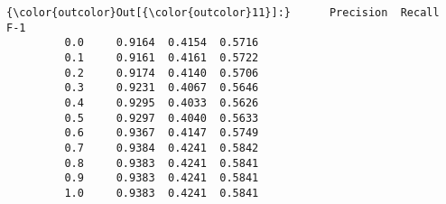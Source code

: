 \documentclass[11pt]{article}
\begin{document}
\begin{Verbatim}[commandchars=\\\{\}]
{\color{outcolor}Out[{\color{outcolor}11}]:}      Precision  Recall     F-1
         0.0     0.9164  0.4154  0.5716
         0.1     0.9161  0.4161  0.5722
         0.2     0.9174  0.4140  0.5706
         0.3     0.9231  0.4067  0.5646
         0.4     0.9295  0.4033  0.5626
         0.5     0.9297  0.4040  0.5633
         0.6     0.9367  0.4147  0.5749
         0.7     0.9384  0.4241  0.5842
         0.8     0.9383  0.4241  0.5841
         0.9     0.9383  0.4241  0.5841
         1.0     0.9383  0.4241  0.5841
\end{Verbatim}
            

    
    
    
    
\end{document}

